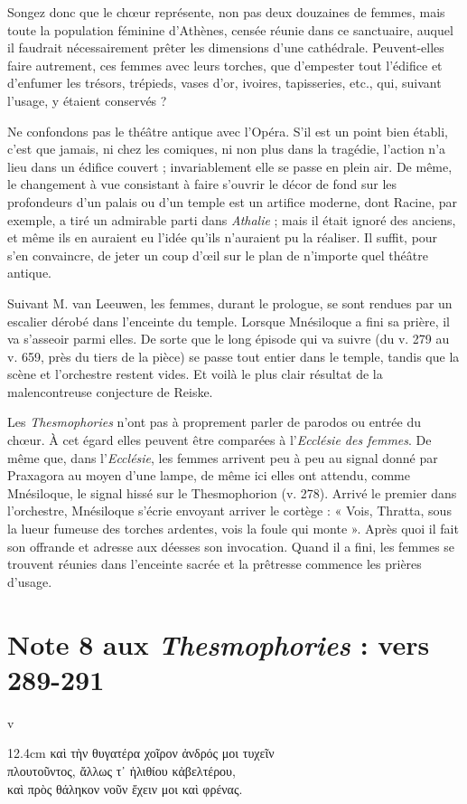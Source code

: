 \documentclass{book}%
\newcommand{\italique}[1]{\textit{#1}}%
\newcommand{\espace}[1]{\hspace{#1}}%
\newcommand{\fantome}{{\color{white}v}}
\newcommand{\Note}[1]{\section*{#1}%
\addcontentsline{toc}{section}{#1}}
\newcommand{\citComm}[1]{\fantome\\
\espace{1cm}\begin{minipagewithmarginpars}{12.4cm}%
#1
\end{minipagewithmarginpars}%
}
\begin{document}
Songez donc que le chœur représente, non pas deux douzaines de femmes, mais toute la population féminine d'Athènes, censée réunie dans ce sanctuaire, auquel il faudrait nécessairement prêter les dimensions d'une cathédrale. Peuvent-elles faire autrement, ces femmes avec leurs torches, que d'empester tout l'édifice et d'enfumer les trésors, trépieds, vases d'or, ivoires, tapisseries, etc., qui, suivant l'usage, y étaient conservés ? 

Ne confondons pas le théâtre antique avec l'Opéra. S'il est un point bien établi, c'est que jamais, ni chez les comiques, ni non plus dans la tragédie, l'action n'a lieu dans un édifice couvert ; invariablement elle se passe en plein air. De même, le changement à vue consistant à faire s'ouvrir le décor de fond sur les profondeurs d'un palais ou d'un temple est un artifice moderne, dont Racine, par exemple, a tiré un admirable parti dans \italique{Athalie} ; mais il était ignoré des anciens, et même ils en auraient eu l'idée qu'ils n'auraient pu la réaliser. Il suffit, pour s'en convaincre, de jeter un coup d'œil sur le plan de n'importe quel théâtre antique.

Suivant M. van Leeuwen, les femmes, durant le prologue, se sont rendues par un escalier dérobé dans l'enceinte du temple. Lorsque Mnésiloque a fini sa prière, il va s'asseoir parmi elles. De sorte que le long épisode qui va suivre (du v. 279 au v. 659, près du tiers de la pièce) se passe tout entier dans le temple, tandis que la scène et l'orchestre restent vides. Et voilà le plus clair résultat de la malencontreuse conjecture de Reiske. 

Les \italique{Thesmophories} n'ont pas à proprement parler de parodos ou entrée du chœur. À cet égard elles peuvent être comparées à l'\italique{Ecclésie des femmes}. De même que, dans l'\italique{Ecclésie}, les femmes arrivent peu à peu au signal donné par Praxagora au moyen d'une lampe, de même ici elles ont attendu, comme Mnésiloque, le signal hissé sur le Thesmophorion (v. 278). Arrivé le premier dans l'orchestre, Mnésiloque s'écrie envoyant arriver le cortège : « Vois, Thratta, sous la lueur fumeuse des torches ardentes, vois la foule qui monte ». 
Après quoi il fait son offrande et adresse aux déesses son invocation. Quand il a fini, les femmes se trouvent réunies dans l'enceinte sacrée et la prêtresse commence les prières d'usage.

\Note{Note 8 aux \italique{Thesmophories} : vers 289-291}

\citComm{καὶ τὴν θυγατέρα χοῖρον ἀνδρός μοι τυχεῖν\\
πλουτοῦντος, ἄλλως τ᾽ ἠλιθίου κἀβελτέρου,\\
καὶ πρὸς θάληκον νοῦν ἔχειν μοι καὶ φρένας.}\\
\end{document}
